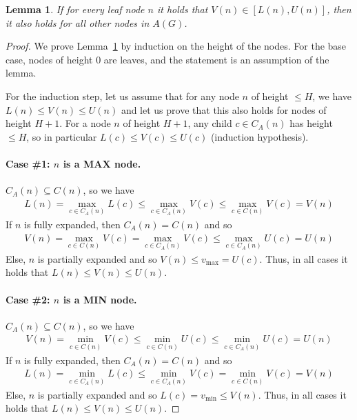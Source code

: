 \documentclass[letterpaper]{article} %
\newtheorem{lemma}{Lemma}
\newcommand{\MM}{\mathit{V}}
\newcommand{\pess}{\mathit{L}}
\newcommand{\opti}{\mathit{U}}
\newcommand{\vmax}{v_{\text{max}}}
\newcommand{\vmin}{v_{\text{min}}}
\begin{document}
\begin{lemma}
  If for every leaf node $n$ it holds that $\MM(n)\in [\pess(n), \opti(n)]$, then it also holds for all other nodes in $A(G)$.
\label{lem:opti-pess}
\end{lemma}
\begin{proof}
We prove Lemma~\ref{lem:opti-pess} by induction on the height of the nodes. For the base case, nodes of height 0 are leaves, and the statement is an assumption of the lemma.

For the induction step, let us assume that for any node $n$ of height $\leq H$, we have $\pess(n)\!\leq\! \MM(n)\!\leq\! \opti(n)$ and let us prove that this also holds for nodes of height $H+1$.
For a node $n$ of height $H+1$, any child $c \in C_A(n)$ has height $\leq H$, so in particular $\pess(c)\!\leq\!\MM(c)\!\leq\!\opti(c)$ (induction hypothesis).

\paragraph{Case \#1: $n$ is a MAX node.}
$C_A(n) \subseteq C(n)$, so we have
\begin{align}
  \pess(n) = \!\!\!\!\max_{c\in C_A(n)} \!\!\!\!\pess(c) \leq \!\!\!\!\max_{c\in C_A(n)} \!\!\!\!\MM(c) \leq \!\!\!\!\max_{c\in C(n)} \!\!\!\! \MM(c) \! = \!\!\MM(n)
\end{align}
If $n$ is fully expanded, then $C_A(n)=C(n)$ and so
\begin{align}
  \MM(n) \!= \!\!\!\max_{c \in C(n)} \!\!\!\!\MM(c) \!= \!\!\!\!\max_{c \in C_A(n)} \!\!\!\!\MM(c) \leq \!\!\!\!\max_{c \in C_A(n)} \!\!\!\!\opti(c) \!= \!\!\opti(n)
\end{align}
Else, $n$ is partially expanded and so $\MM(n) \leq \vmax = \opti(c)$.
Thus, in all cases it holds that $\pess(n) \leq \MM(n) \leq \opti(n)$.


\paragraph{Case \#2: $n$ is a MIN node.}
$C_A(n) \subseteq C(n)$, so we have
\begin{align}
  \MM(n) \!= \!\!\!\!\min_{c\in C(n)} \!\!\!\!\MM(c) \leq \!\!\!\!\min_{c\in C(n)} \!\!\!\!\opti(c) \leq \!\!\!\!\min_{c \in C_A(n)} \!\!\!\! \opti(c) \! = \! \opti(n)
\end{align}
If $n$ is fully expanded, then $C_A(n)=C(n)$ and so
\begin{align}
  \pess(n) \! = \!\!\!\!\min_{c \in C_A(n)} \!\!\!\!\pess(c) \leq \!\!\!\!\min_{c \in C_A(n)} \!\!\!\!\MM(c) = \!\!\!\!\min_{c \in C(n)} \!\!\!\!\MM(c) \!=\! \MM(n)
\end{align}
Else, $n$ is partially expanded and so $\pess(c) = \vmin\leq \MM(n)$. 
Thus, in all cases it holds that $\pess(n) \leq \MM(n) \leq \opti(n)$.


\end{proof}
\end{document}
